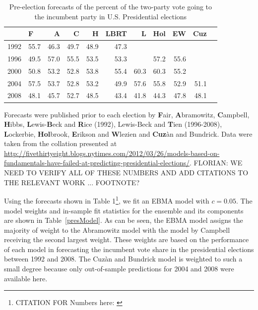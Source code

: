 \documentclass[12pt,fullpage,endnotes]{article}
\begin{document}
\begin{table}[ht]
\caption{Pre-election forecasts of the percent of the two-party vote going to the incumbent party in U.S. Presidential elections}
\label{tab:one}
\footnotesize
\begin{center}
\begin{tabular}{rlrrrrrrrrr}
  \toprule
  & F & A & C & H & LBRT & L & Hol & EW & Cuz \\ 
  \midrule
  1992 & 55.7 & 46.3 & 49.7 & 48.9 & 47.3 &  &  &  &  \\ 
  1996 & 49.5 & 57.0 & 55.5 & 53.5 & 53.3 &  & 57.2 & 55.6 &  \\ 
  2000 & 50.8 & 53.2 & 52.8 & 53.8 & 55.4 & 60.3 & 60.3 & 55.2 &  \\ 
  2004 & 57.5 & 53.7 & 52.8 & 53.2 & 49.9 & 57.6 & 55.8 & 52.9 & 51.1 \\ 
  2008 & 48.1 & 45.7 & 52.7 & 48.5 & 43.4 & 41.8 & 44.3 & 47.8 & 48.1 \\ 
  \bottomrule

\end{tabular}
\end{center}
Forecasts were published prior to each election by \textbf{F}air, \textbf{A}bramowitz, \textbf{C}ampbell, \textbf{H}ibbs, \textbf{L}ewis-\textbf{B}eck and \textbf{R}ice (1992), Lewis-Beck and \textbf{T}ien  (1996-2008),   \textbf{L}ockerbie, \textbf{Hol}brook, \textbf{E}rikson and \textbf{W}lezien and \textbf{Cuz}\`an and Bundrick.  Data were taken from the collation presented at \url{http://fivethirtyeight.blogs.nytimes.com/2012/03/26/models-based-on-fundamentals-have-failed-at-predicting-presidential-elections/}. FLORIAN: WE NEED TO VERIFY ALL OF THESE NUMBERS AND ADD CITATIONS TO THE RELEVANT WORK ... FOOTNOTE?
\end{table}


Using the forecasts shown in Table 1\footnote{CITATION FOR Numbers here: \citep{LewisBeckTien:1996,EriksonWlezien:1996}}, we fit an EBMA model with
$c=0.05$.  The model weights and in-sample fit statistics for the
ensemble and its components are shown in Table~\ref{presModel}.  As
can be seen, the EBMA model assigns the majority of weight to the
Abramowitz model with the model by Campbell receiving the second
largest weight. These weights are based on the performance of each
model in forecasting the incumbent vote share in the presidential
elections between 1992 and 2008. The Cuz\`an and Bundrick model is
weighted to such a small degree because only out-of-sample predictions
for 2004 and 2008 were available here.
\end{document}
